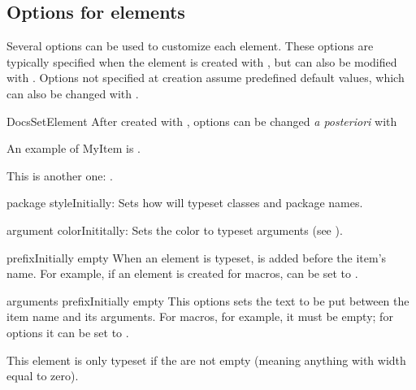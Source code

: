 \documentclass[11pt, outdir = ./out]{article}
\begin{document}
\subsection{Options for elements}\label{sec:options-for-elements}

Several options can be used to customize each element. These options are typically specified when the element is created with , but can also be modified with . Options not specified at creation assume predefined default values, which can also be changed with .

\begin{Macrodef}{DocsSetElement}{}{}
    After created with , options can be changed \textit{a posteriori} with 
\end{Macrodef}

\begin{DocsExample}
    An example of MyItem is .\par
    This is another one: .
\end{DocsExample}

\begin{Optiondef}{package style}{}{Initially: }
    Sets how  will typeset classes and package names.
\end{Optiondef}

\begin{Optiondef}{argument color}{}{Inititally: }
    Sets the color to typeset arguments (see ).
\end{Optiondef}

\begin{Optiondef}{prefix}{}{Initially empty}
    When an element is typeset,  is added before the item's name. For example, if an element is created for macros,  can be set to .
\end{Optiondef}

\begin{Optiondef}{arguments prefix}{}{Initially empty}
    This options sets the text to be put between the item name and its arguments. For macros, for example, it must be empty; for options it can be set to \DocsInline{=}.

    This element is only typeset if the  are not empty (meaning anything with width equal to zero).
\end{Optiondef}
\end{document}
